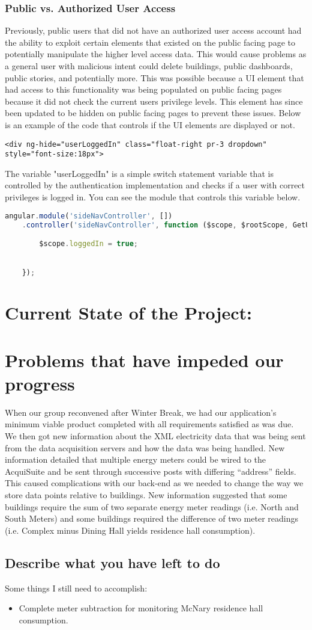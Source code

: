 \documentclass[letterpaper,10pt,serif,draftclsnofoot,onecolumn,compsoc,titlepage]{IEEEtran}
\begin{document}
\subsubsection{Public vs. Authorized User Access}
Previously, public users that did not have an authorized user access account had the ability to exploit certain elements that existed on the public facing page to potentially manipulate the higher level access data. This would cause problems as a general user with malicious intent could delete buildings, public dashboards, public stories, and potentially more. This was possible because a UI element that had access to this functionality was being populated on public facing pages because it did not check the current users privilege levels. This element has since been updated to be hidden on public facing pages to prevent these issues.
Below is an example of the code that controls if the UI elements are displayed or not.
\begin{lstlisting}
<div ng-hide="userLoggedIn" class="float-right pr-3 dropdown" style="font-size:18px">
\end{lstlisting}
The variable "userLoggedIn" is a simple switch statement variable that is controlled by the authentication implementation and checks if a user with correct privileges is logged in. You can see the module that controls this variable below.
\begin{lstlisting}[language=JavaScript]
angular.module('sideNavController', [])
    .controller('sideNavController', function ($scope, $rootScope, GetUser, Story) {

        $scope.loggedIn = true;


    });
\end{lstlisting}

\section{Current State of the Project:} 

\section{Problems that have impeded our progress}
When our group reconvened after Winter Break, we had our application's minimum viable product completed with all requirements satisfied as was due. We then got new information about the XML electricity data that was being sent from the data acquisition servers and how the data was being handled. New information detailed that multiple energy meters could be wired to the AcquiSuite and be sent through successive posts with differing ``address'' fields. This caused complications with our back-end as we needed to change the way we store data points relative to buildings. New information suggested that some buildings require the sum of two separate energy meter readings (i.e. North and South Meters) and some buildings required the difference of two meter readings (i.e. Complex minus Dining Hall yields residence hall consumption).
\subsection{Describe what you have left to do}
Some things I still need to accomplish:
\begin{itemize}
  \item Complete meter subtraction for monitoring McNary residence hall consumption.
\end{itemize}
\newpage
\cite{mongoose}


\end{document}
